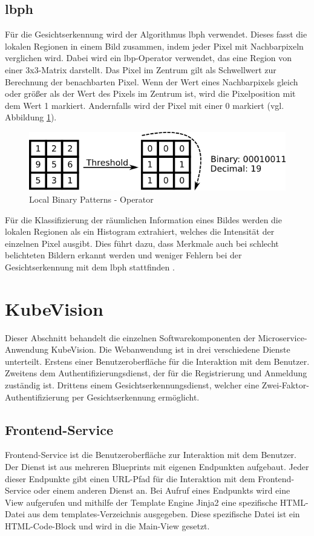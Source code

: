 \subsection{ \ac*{lbph} }
Für die Gesichtserkennung wird der Algorithmus \acs{lbph} verwendet.
Dieses fasst die lokalen Regionen in einem Bild zusammen, indem jeder Pixel mit Nachbarpixeln verglichen wird.
Dabei wird ein \ac{lbp}-Operator verwendet, das eine Region von einer 3x3-Matrix darstellt.
Das Pixel im Zentrum gilt als Schwellwert zur Berechnung der benachbarten Pixel.
Wenn der Wert eines Nachbarpixels gleich oder größer als der Wert des Pixels im Zentrum ist, wird die Pixelposition mit dem Wert 1 markiert.
Andernfalls wird der Pixel mit einer 0 markiert \cite{opencvlbp} (vgl. Abbildung \ref{fig:lbp}).

\begin{figure}[!htb]
  \centering
  \includegraphics[width=1.0\columnwidth]{images/lbp.png}
  \caption{Local Binary Patterns - Operator \cite{opencvlbp}}
  \label{fig:lbp}
\end{figure}

Für die Klassifizierung der räumlichen Information eines Bildes werden die lokalen Regionen als ein Histogram extrahiert, welches die Intensität der einzelnen Pixel ausgibt.
Dies führt dazu, dass Merkmale auch bei schlecht belichteten Bildern erkannt werden und weniger Fehlern bei der Gesichtserkennung mit dem \acs{lbph} stattfinden \cite{realtimefacerecog}.


\section{KubeVision}
Dieser Abschnitt behandelt die einzelnen Softwarekomponenten der Microservice-Anwendung KubeVision.
Die Webanwendung ist in drei verschiedene Dienste unterteilt.
Erstens einer Benutzeroberfläche für die Interaktion mit dem Benutzer.
Zweitens dem Authentifizierungsdienst, der für die Registrierung und Anmeldung zuständig ist.
Drittens einem Gesichtserkennungsdienst, welcher eine Zwei-Faktor-Authentifizierung per Gesichtserkennung ermöglicht.

\subsection{Frontend-Service}
Frontend-Service ist die Benutzeroberfläche zur Interaktion mit dem Benutzer.
Der Dienst ist aus mehreren Blueprints mit eigenen Endpunkten aufgebaut.
Jeder dieser Endpunkte gibt einen URL-Pfad für die Interaktion mit dem Frontend-Service oder einem anderen Dienst an.
Bei Aufruf eines Endpunkts wird eine View aufgerufen und mithilfe der Template Engine Jinja2 eine spezifische HTML-Datei aus dem templates-Verzeichnis ausgegeben.
Diese spezifische Datei ist ein HTML-Code-Block und wird in die Main-View gesetzt.

